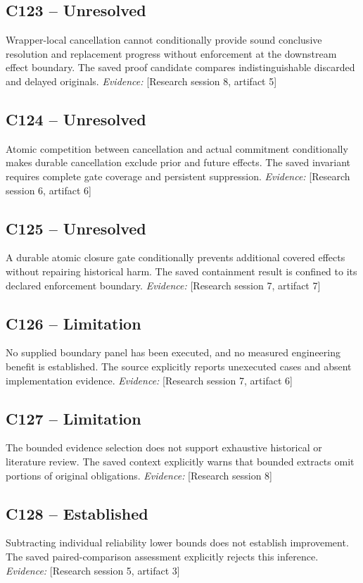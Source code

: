 \documentclass[11pt]{article}
\begin{document}
\begin{sloppypar}
\subsection{C123 -- Unresolved}
Wrapper-local cancellation cannot conditionally provide sound conclusive resolution and replacement progress without enforcement at the downstream effect boundary.
The saved proof candidate compares indistinguishable discarded and delayed originals.
\textit{Evidence: }[Research session 8, artifact 5]
\subsection{C124 -- Unresolved}
Atomic competition between cancellation and actual commitment conditionally makes durable cancellation exclude prior and future effects.
The saved invariant requires complete gate coverage and persistent suppression.
\textit{Evidence: }[Research session 6, artifact 6]
\subsection{C125 -- Unresolved}
A durable atomic closure gate conditionally prevents additional covered effects without repairing historical harm.
The saved containment result is confined to its declared enforcement boundary.
\textit{Evidence: }[Research session 7, artifact 7]
\subsection{C126 -- Limitation}
No supplied boundary panel has been executed, and no measured engineering benefit is established.
The source explicitly reports unexecuted cases and absent implementation evidence.
\textit{Evidence: }[Research session 7, artifact 6]
\subsection{C127 -- Limitation}
The bounded evidence selection does not support exhaustive historical or literature review.
The saved context explicitly warns that bounded extracts omit portions of original obligations.
\textit{Evidence: }[Research session 8]
\subsection{C128 -- Established}
Subtracting individual reliability lower bounds does not establish improvement.
The saved paired-comparison assessment explicitly rejects this inference.
\textit{Evidence: }[Research session 5, artifact 3]

\end{sloppypar}
\end{document}
